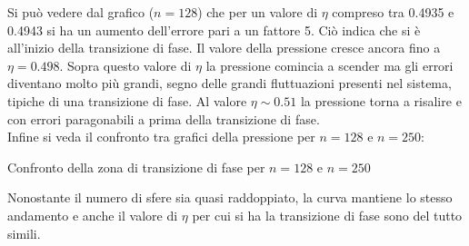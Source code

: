 Si può vedere dal grafico ($n=128$) che per un valore di $\eta$ compreso tra 0.4935 e 0.4943 si ha un aumento dell'errore pari a un fattore 5. Ciò indica che si è all'inizio della transizione di fase.
Il valore della pressione cresce ancora fino a $\eta = 0.498$.
Sopra questo valore di $\eta$ la pressione comincia a scender ma gli errori diventano molto più grandi, segno delle grandi fluttuazioni presenti nel sistema, tipiche di una transizione di fase.
Al valore $\eta \sim 0.51$ la pressione torna a risalire e con errori paragonabili a prima della transizione di fase.\\
Infine si veda il confronto tra grafici della pressione per $n=128$ e $n=250$:

\begin{myfig}[h]
	\caption{Confronto della zona di transizione di fase per $n=128$ e $n=250$}
\end{myfig}
Nonostante il numero di sfere sia quasi raddoppiato, la curva mantiene lo stesso andamento e anche il valore di $\eta$ per cui si ha la transizione di fase sono del tutto simili. 


